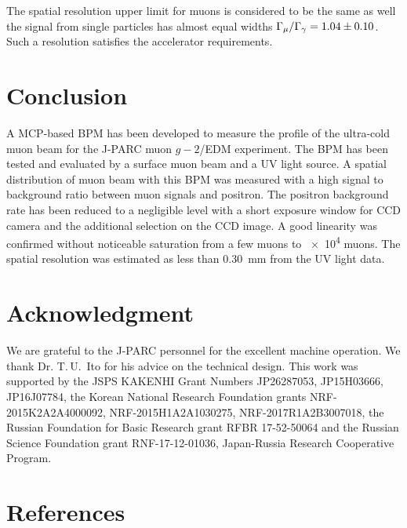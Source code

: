 \documentclass[preprint,3p,twocolumn]{elsarticle}
\begin{document}
The spatial resolution upper limit for muons is considered to be the same as well the signal from single particles has almost equal widths
$\Gamma_{\mu} / \Gamma_{\gamma} = \num{1.04 \pm 0.10}$.
Such a resolution satisfies the accelerator requirements.


\section{Conclusion}

A MCP-based BPM has been developed to measure the profile of  the ultra-cold muon beam 
for the J-PARC muon $g-2$/EDM experiment. 
The BPM has been tested and evaluated by a surface muon beam and a UV light source.
A spatial distribution of muon beam with this BPM was measured with
a high signal to background ratio between muon signals and positron.
The positron background rate has been reduced to a negligible level with 
a short exposure window for CCD camera and the additional selection on the CCD image.
A good linearity was confirmed without noticeable saturation from a few muons to \num{e4} muons.
The spatial resolution was estimated as less than \SI{.30}{\mm} from the UV light data.


\section*{Acknowledgment}

We are grateful to the J-PARC personnel for the excellent machine operation.
We thank Dr. T.\,U.~Ito for his advice on the technical design.
This work was supported by 
the JSPS KAKENHI Grant Numbers JP26287053, JP15H03666, JP16J07784,
the Korean National Research Foundation grants NRF-2015K2A2A4000092, NRF-2015H1A2A1030275, NRF-2017R1A2B3007018,
the Russian Foundation for Basic Research grant RFBR 17-52-50064 and
the Russian Science Foundation grant RNF-17-12-01036,
Japan-Russia Research Cooperative Program.

\section*{References}


\end{document}
